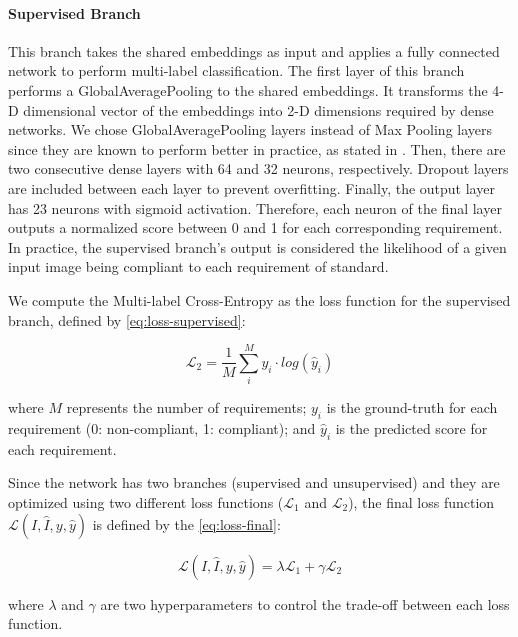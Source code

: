 \paragraph{Supervised Branch}

This branch takes the shared embeddings as input and applies a fully connected network to perform multi-label classification. The first layer of this branch performs a GlobalAveragePooling to the shared embeddings. It transforms the 4-D dimensional vector of the embeddings into 2-D dimensions required by dense networks. We chose GlobalAveragePooling layers instead of Max Pooling layers since they are known to perform better in practice, as stated in \cite{zhou2016learning}. Then, there are two consecutive dense layers with 64 and 32 neurons, respectively. Dropout layers are included between each layer to prevent overfitting. Finally, the output layer has 23 neurons with sigmoid activation. Therefore, each neuron of the final layer outputs a normalized score between 0 and 1 for each corresponding requirement. In practice, the supervised branch's output is considered the likelihood of a given input image being compliant to each requirement of \icao standard.

We compute the Multi-label Cross-Entropy as the loss function for the supervised branch, defined by \autoref{eq:loss-supervised}:

\begin{equation}
\label{eq:loss-supervised}
\mathcal{L}_2 = \frac{1}{M} \sum_i^M {y_i \cdot log(\hat{y}_i)}
\end{equation}

\noindent where $M$ represents the number of requirements; $y_i$ is the ground-truth for each requirement (0: non-compliant, 1: compliant); and $\hat{y}_i$ is the predicted score for each requirement.

Since the network has two branches (supervised and unsupervised) and they are optimized using two different loss functions ($\mathcal{L}_1$ and $\mathcal{L}_2$), the final loss function $\mathcal{L}(I, \hat{I}, y, \hat{y})$ is defined by the \autoref{eq:loss-final}:

\begin{equation}
\label{eq:loss-final}
\mathcal{L}(I, \hat{I}, y, \hat{y}) = \lambda\mathcal{L}_1 + \gamma\mathcal{L}_2
\end{equation}

\noindent where $\lambda$ and $\gamma$ are two hyperparameters to control the trade-off between each loss function.

